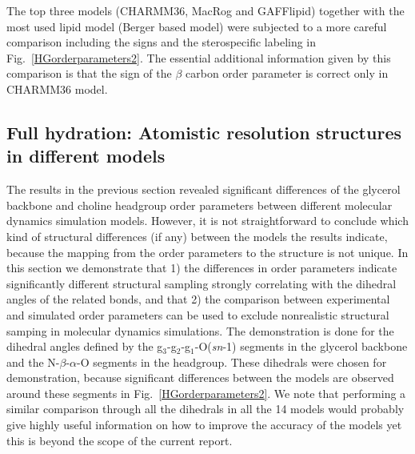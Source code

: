 \documentclass[pre,aps,floatfix,authordate1-4,twocolumn]{revtex4-1}
\begin{document}
The top three models (CHARMM36, MacRog and GAFFlipid) together with the most used lipid model (Berger based model) 
were subjected to a more careful comparison including the signs and the sterospecific labeling in Fig.~\ref{HGorderparameters2}.
The essential additional information given by this comparison is that the sign of the $\beta$ carbon order parameter is correct only in CHARMM36 model.


\subsection{Full hydration: Atomistic resolution structures in different models}

The results in the previous section revealed significant differences of the glycerol backbone and choline headgroup
order parameters between different molecular dynamics simulation models.
However, it is not straightforward to conclude which kind of structural differences (if any)
between the models the results indicate, because the mapping from the order parameters to the 
structure is not unique. In this section we demonstrate that 1) the differences in order parameters
indicate significantly different structural sampling strongly correlating with the dihedral angles of the related bonds,
and that 2) the comparison between experimental and simulated order parameters can be used to exclude
nonrealistic structural samping in molecular dynamics simulations. The demonstration is done for 
the dihedral angles defined by the g$_3$-g$_2$-g$_1$-O(\textit{sn}-1) segments in the glycerol backbone and 
the N-$\beta$-$\alpha$-O segments in the headgroup. These dihedrals were chosen for demonstration, because 
significant differences between the models are observed around these segments in Fig.~\ref{HGorderparameters2}.
We note that performing a similar comparison through all the dihedrals in all the 14 models would probably give highly useful
information on how to improve the accuracy of the models yet this is beyond the scope of the current report. 
\end{document}
